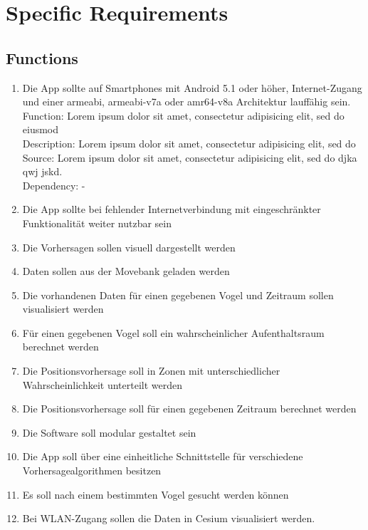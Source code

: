 \documentclass[12pt]{article} %
\begin{document}
\section{Specific Requirements}



\subsection{Functions}

\begin{enumerate}[(R1)]
		\item Die App sollte auf Smartphones mit Android 5.1 oder höher, Internet-Zugang und einer armeabi, armeabi-v7a oder amr64-v8a Architektur lauffähig sein. \\
		Function: Lorem ipsum dolor sit amet, consectetur adipisicing elit, sed do eiusmod \\
		Description:  Lorem ipsum dolor sit amet, consectetur adipisicing elit, sed do \\
		Source:  Lorem ipsum dolor sit amet, consectetur adipisicing elit, sed do djka qwj jskd. \\
		Dependency: -
		\item Die App sollte bei fehlender Internetverbindung mit eingeschränkter Funktionalität weiter nutzbar sein
		\item Die Vorhersagen sollen visuell dargestellt werden
		\item Daten sollen aus der Movebank geladen werden
		\item Die vorhandenen Daten für einen gegebenen Vogel und Zeitraum sollen visualisiert werden
		\item Für einen gegebenen Vogel soll ein wahrscheinlicher Aufenthaltsraum berechnet werden
		\item Die Positionsvorhersage soll in Zonen mit unterschiedlicher Wahrscheinlichkeit unterteilt werden
		\item Die Positionsvorhersage soll für einen gegebenen Zeitraum berechnet werden
		\item Die Software soll modular gestaltet sein
		\item Die App soll über eine einheitliche Schnittstelle für verschiedene Vorhersagealgorithmen besitzen
		\item Es soll nach einem bestimmten Vogel gesucht werden können
		\item Bei WLAN-Zugang sollen die Daten in Cesium visualisiert werden.

\end{enumerate}
\end{document}
